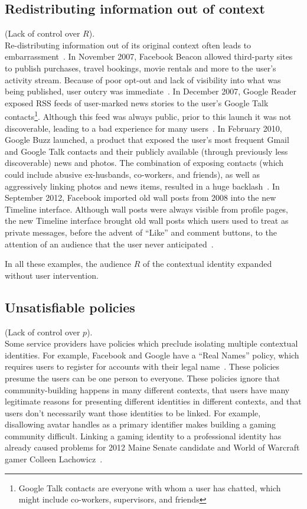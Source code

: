 \documentclass{llncs}
\begin{document}
\subsection{Redistributing information out of context}
(Lack of control over $R$).\\
Re-distributing information out of its original context often leads to
embarrassment~\cite{nissenbaum}.  In November 2007, Facebook Beacon allowed
third-party sites to publish purchases, travel bookings, movie rentals and more to the
user's activity stream.  Because of poor opt-out and lack of visibility into
what was being published, user outcry was immediate~\cite{mccarthy,nakashima}.
In December 2007, Google Reader exposed RSS feeds of user-marked news stories
to the user's Google Talk contacts\footnote{Google Talk contacts are everyone
with whom a user has chatted, which might include co-workers, supervisors, and
friends}. Although this feed was always public, prior to this launch it was not
discoverable, leading to a bad experience for many users~\cite{helft}. In
February 2010, Google Buzz launched, a product that
exposed the user's most frequent Gmail and Google Talk contacts and their
publicly available (through previously less discoverable) news and photos.  The
combination of exposing contacts (which could include abusive ex-husbands,
co-workers, and friends), as well as aggressively linking photos and news
items, resulted in a huge backlash~\cite{fugitivus,buzz}. In September 2012,
Facebook imported old wall posts from 2008 into the new Timeline interface.
Although wall posts were always visible from profile pages, the new Timeline
interface brought old wall posts which users used to treat as private
messages, before the advent of ``Like'' and comment buttons, to the attention
of an audience that the user never anticipated~\cite{timeline}.

In all these examples, the audience $R$ of the contextual identity expanded
without user intervention.

\subsection{Unsatisfiable policies}
\label{sec:policies}
(Lack of control over $p$).\\
Some service providers have policies which preclude isolating multiple
contextual identities. For example, Facebook and Google have a ``Real Names'' policy, which
requires users to register for accounts with their legal
name~\cite{fb_names,google_names}.  These policies presume the users can be one
person to everyone. These policies ignore that community-building happens in
many different contexts, that users have many legitimate reasons for presenting
different identities in different contexts, and that users don't necessarily
want those identities to be linked. For example, disallowing avatar handles as
a primary identifier makes building a gaming community difficult. 
Linking a gaming identity to a professional identity has already caused
problems for 2012 Maine Senate candidate and World of Warcraft gamer Colleen
Lachowicz~\cite{maine}.
\end{document}
